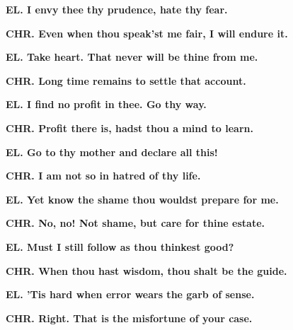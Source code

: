 \documentclass[11pt,letter]{book}
\begin{document}
\par \textbf{EL. I envy thee thy prudence, hate thy fear.}
\par 

\par \textbf{CHR. Even when thou speak’st me fair, I will endure it.}
\par 

\par \textbf{EL. Take heart. That never will be thine from me.}
\par 

\par \textbf{CHR. Long time remains to settle that account.}
\par 

\par \textbf{EL. I find no profit in thee. Go thy way.}
\par 

\par \textbf{CHR. Profit there is, hadst thou a mind to learn.}
\par 

\par \textbf{EL. Go to thy mother and declare all this!}
\par 

\par \textbf{CHR. I am not so in hatred of thy life.}
\par 

\par \textbf{EL. Yet know the shame thou wouldst prepare for me.}
\par 

\par \textbf{CHR. No, no! Not shame, but care for thine estate.}
\par 

\par \textbf{EL. Must I still follow as thou thinkest good?}
\par 

\par \textbf{CHR. When thou hast wisdom, thou shalt be the guide.}
\par 

\par \textbf{EL. ’Tis hard when error wears the garb of sense.}
\par 

\par \textbf{CHR. Right. That is the misfortune of your case.}
\par 
\end{document}
